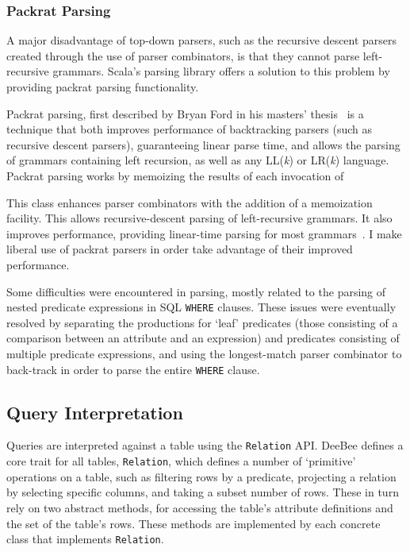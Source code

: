 \subsubsection{Packrat Parsing}
A major disadvantage of top-down parsers, such as the recursive descent parsers created through the use of parser combinators, is that they cannot parse left-recursive grammars. Scala's parsing library offers a solution to this problem by providing packrat parsing functionality.

Packrat parsing, first described by Bryan Ford in his masters' thesis~\cite{ford2002packrat} is a technique that both improves performance of backtracking parsers (such as recursive descent parsers), guaranteeing linear parse time, and allows the parsing of grammars containing left recursion, as well as any LL(\textit{k}) or LR(\textit{k}) language. Packrat parsing works by memoizing the results of each invocation of 

This class enhances parser combinators with the addition of a memoization facility. This allows recursive-descent parsing of left-recursive grammars. It also improves performance, providing linear-time parsing for most grammars~\cite{jonnalagedda2009packrat,ford2002packrat,ford2002packrat2}. I make liberal use of packrat parsers in order take advantage of their improved performance.

Some difficulties were encountered in parsing, mostly related to the parsing of nested predicate expressions in SQL \texttt{WHERE} clauses. These issues were eventually resolved by separating the productions for `leaf' predicates (those consisting of a comparison between an attribute and an expression) and predicates consisting of multiple predicate expressions, and using the longest-match parser combinator to back-track in order to parse the entire \texttt{WHERE} clause.

\subsection{Query Interpretation}
\label{sec:query}
Queries are interpreted against a table using the \texttt{Relation} API. DeeBee defines a core trait for all tables, \texttt{Relation}, which defines a number of `primitive' operations on a table, such as filtering rows by a predicate, projecting a relation by selecting specific columns, and taking a subset number of rows. These in turn rely on two abstract methods, for accessing the table's attribute definitions and the set of the table's rows. These methods are implemented by each concrete class that implements \texttt{Relation}.

